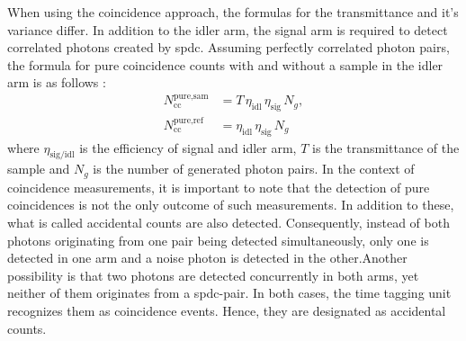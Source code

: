 \begin{comment}
	\begin{equation}
		\begin{aligned}
			\operatorname{Var}(T) 
			= \left( \frac{1}{\eta_{\text{idl}}\,N_g} \right)^{2}
			\Bigg[
			\operatorname{Var}\!\left(N_{\text{tot}}^{\text{sam}}\right) 
			+ \operatorname{Var}\!\left(N_{\text{noise}}^{\text{sam}}\right) 
			+ T^{2} \Big( 
			\operatorname{Var}\!\left(N_{\text{tot}}^{\text{ref}}\right) 
			+ \operatorname{Var}\!\left(N_{\text{noise}}^{\text{ref}}\right) 
			\Big)
			\Bigg]
			\operatorname{Var}(T) 
			&= \frac{1}{\big( N_{\text{tot}}^{\text{ref}} - N_{\text{noise}}^{\text{ref}} \big)^{2}}
			\Big[ \operatorname{Var}\!\left( N_{\text{tot}}^{\text{sam}} \right)
			+ \operatorname{Var}\!\left( N_{\text{noise}}^{\text{sam}} \right) \Big] \\[0.75em]
			&\quad + \frac{\big( N_{\text{tot}}^{\text{sam}} - N_{\text{noise}}^{\text{sam}} \big)^{2}}
			{\big( N_{\text{tot}}^{\text{ref}} - N_{\text{noise}}^{\text{ref}} \big)^{4}}
			\Big[ \operatorname{Var}\!\left( N_{\text{tot}}^{\text{ref}} \right)
			+ \operatorname{Var}\!\left( N_{\text{noise}}^{\text{ref}} \right) \Big]
		\end{aligned}
		\label{eq:VarianceTransExpl}
	\end{equation}
\end{comment}
When using the coincidence approach, the formulas for the transmittance and it's variance differ. In addition to the idler arm, the signal arm is required to detect correlated photons created by \acrshort{spdc}. Assuming perfectly correlated photon pairs, the formula for pure coincidence counts with and without a sample in the idler arm is as follows \cite{hayatTheoryPhotonCoincidence1999}:
\begin{equation}
	\begin{aligned}
		N_{\text{cc}}^{\text{pure,sam}} &= T \,\eta_{\text{idl}} \,\eta_{\text{sig}} \, N_g, \\[0.5em]
		N_{\text{cc}}^{\text{pure,ref}} &= \eta_{\text{idl}} \,\eta_{\text{sig}} \, N_g
	\end{aligned}
	\label{eq:pureCoinc}
\end{equation}
where $\eta_{\text{sig/idl}}$ is the efficiency of signal and idler arm, $T$ is the transmittance of the sample and $N_g$ is the number of generated photon pairs. \newline
In the context of coincidence measurements, it is important to note that the detection of pure coincidences is not the only outcome of such measurements. In addition to these, what is called accidental counts are also detected. Consequently, instead of both photons originating from one pair being detected simultaneously, only one is detected in one arm and a noise photon is detected in the other.Another possibility is that two photons are detected concurrently in both arms, yet neither of them originates from a \acrshort{spdc}-pair. In both cases, the time tagging unit recognizes them as coincidence events. Hence, they are designated as accidental counts. \newline
